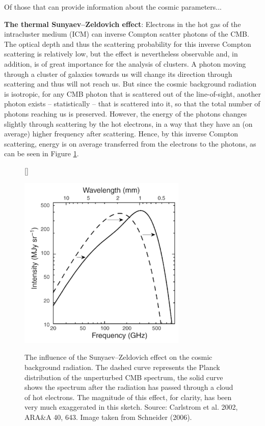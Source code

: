 \documentclass[a4paper,11pt]{article}
\begin{document}
{\noindent}Of those that can provide information about the cosmic parameters...

{\noindent}\textbf{The thermal Sunyaev–Zeldovich effect}: Electrons in the hot gas of the intracluster medium (ICM) can inverse Compton scatter photons of the CMB. The optical depth and thus the scattering probability for this inverse Compton scattering is relatively low, but the effect is nevertheless observable and, in addition, is of great importance for the analysis of clusters. A photon moving through a cluster of galaxies towards us will change its direction through scattering and thus will not reach us. But since the cosmic background radiation is isotropic, for any CMB photon that is scattered out of the line-of-sight, another photon exists -- statistically -- that is scattered into it, so that the total number of photons reaching us is preserved. However, the energy of the photons changes slightly through scattering by the hot electrons, in a way that they have an (on average) higher frequency after scattering. Hence, by this inverse Compton scattering, energy is on average transferred from the electrons to the photons, as can be seen in Figure \ref{fig:szeffect}.

\begin{figure}[h]
    [\FBwidth]
    {\caption{\footnotesize{The influence of the Sunyaev–Zeldovich effect on the cosmic background radiation. The dashed curve represents the Planck distribution of the unperturbed CMB spectrum, the solid curve shows the spectrum after the radiation has passed through a cloud of hot electrons. The magnitude of this effect, for clarity, has been very much exaggerated in this sketch. Source: Carlstrom et al. 2002, ARA\&A 40, 643. Image taken from Schneider (2006).}}
    \label{fig:szeffect}}
    {\includegraphics[width=8cm]{figures/SZeffect.png}}
\end{figure}
\end{document}
